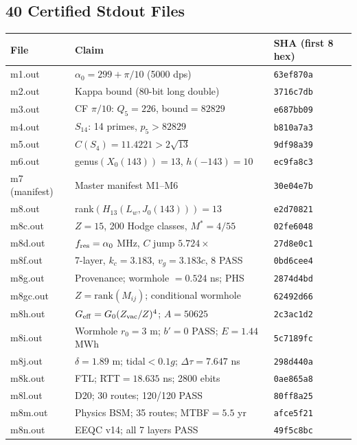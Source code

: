 \documentclass[12pt,letterpaper]{article}
\begin{document}
\subsection{40 Certified Stdout Files}

\begin{center}
\begin{longtable}{lll}
\toprule
File & Claim & SHA (first 8 hex) \\
\midrule
m1.out & $\alpha_0 = 299+\pi/10$ (5000 dps) & \texttt{63ef870a} \\
m2.out & Kappa bound (80-bit long double) & \texttt{3716c7db} \\
m3.out & CF $\pi/10$: $Q_5=226$, bound$=82829$ & \texttt{e687bb09} \\
m4.out & $S_{14}$: 14 primes, $p_5 > 82829$ & \texttt{b810a7a3} \\
m5.out & $C(S_4) = 11.4221 > 2\sqrt{13}$ & \texttt{9df98a39} \\
m6.out & genus$(X_0(143))=13$, $h(-143)=10$ & \texttt{ec9fa8c3} \\
m7 (manifest) & Master manifest M1--M6 & \texttt{30e04e7b} \\
m8.out & rank$(H_{13}(L_w, J_0(143))) = 13$ & \texttt{e2d70821} \\
m8c.out & $Z=15$, 200 Hodge classes, $M^*=4/55$ & \texttt{02fe6048} \\
m8d.out & $f_{\rm res}=\alpha_0$ MHz, $C$ jump $5.724\times$ & \texttt{27d8e0c1} \\
m8f.out & 7-layer, $k_c=3.183$, $v_g=3.183c$, 8 PASS & \texttt{0bd6cee4} \\
m8g.out & Provenance; wormhole $= 0.524$ ns; PHS & \texttt{2874d4bd} \\
m8gc.out & $Z=\mathrm{rank}(M_{ij})$; conditional wormhole & \texttt{62492d66} \\
m8h.out & $G_{\rm eff}=G_0(Z_{\rm vac}/Z)^4$; $A=50625$ & \texttt{2c3ac1d2} \\
m8i.out & Wormhole $r_0=3$ m; $b'=0$ PASS; $E=1.44$ MWh & \texttt{5c7189fc} \\
m8j.out & $\delta=1.89$ m; tidal$<0.1g$; $\Delta\tau=7.647$ ns & \texttt{298d440a} \\
m8k.out & FTL; RTT$=18.635$ ns; 2800 ebits & \texttt{0ae865a8} \\
m8l.out & D20; 30 routes; 120/120 PASS & \texttt{80ff8a25} \\
m8m.out & Physics BSM; 35 routes; MTBF$=5.5$ yr & \texttt{afce5f21} \\
m8n.out & EEQC v14; all 7 layers PASS & \texttt{49f5c8bc} \\

\end{longtable}
\end{center}
\end{document}
